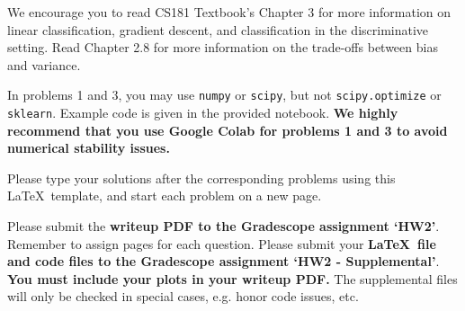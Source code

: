\documentclass[submit]{../harvardml}
\begin{document}
We encourage you to read CS181 Textbook's Chapter 3 for more
information on linear classification, gradient descent, and
classification in the discriminative setting. Read Chapter 2.8 for
more information on the trade-offs between bias and variance.

In problems 1 and 3, you may use \texttt{numpy} or \texttt{scipy}, but
not \texttt{scipy.optimize} or \texttt{sklearn}. Example code is given
in the provided notebook. \textbf{We highly recommend that you use Google Colab for problems 1 and 3 to avoid numerical stability issues.}

Please type your solutions after the corresponding problems using this
\LaTeX\ template, and start each problem on a new page.

Please submit the \textbf{writeup PDF to the Gradescope assignment
  `HW2'}. Remember to assign pages for each question.  Please submit
your \textbf{\LaTeX\ file and code files to the Gradescope assignment
  `HW2 - Supplemental'}. \textbf{You must include your plots in your
  writeup PDF. } The supplemental files will only be checked in
special cases, e.g. honor code issues, etc.


\end{document}

